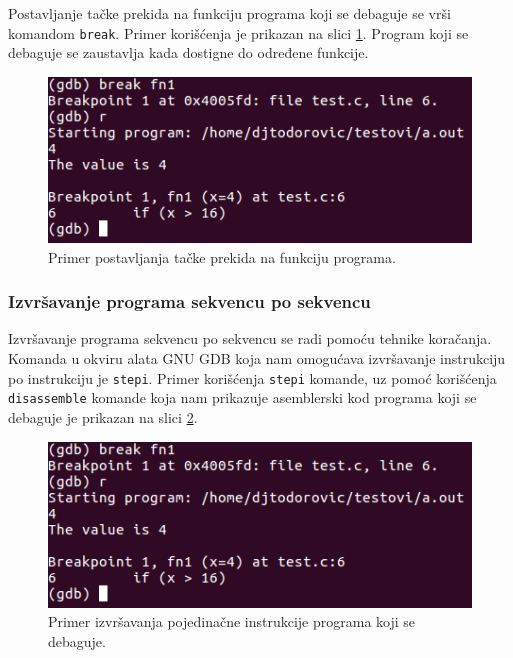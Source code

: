 \documentclass[12pt,oneside]{memoir}
\begin{document}
Postavljanje tačke prekida na funkciju programa koji se debaguje se vrši komandom \texttt{break}. Primer korišćenja je prikazan na slici \ref{fig:break-fn}. Program koji se debaguje se zaustavlja kada dostigne do određene funkcije.

\begin{figure}[h!]
	\begin{center}
		\includegraphics[scale=0.5]{slike/break-fn.png}
	\end{center}
	\caption{Primer postavljanja tačke prekida na funkciju programa.}
	\label{fig:break-fn}
\end{figure}

\subsubsection{Izvršavanje programa sekvencu po sekvencu}

Izvršavanje programa sekvencu po sekvencu se radi pomoću tehnike koračanja. Komanda u okviru alata GNU GDB koja nam omogućava izvršavanje instrukciju po instrukciju je \texttt{stepi}. Primer korišćenja \texttt{stepi} komande, uz pomoć korišćenja \texttt{disassemble} komande koja nam prikazuje asemblerski kod programa koji se debaguje je prikazan na slici \ref{fig:stepi}.

\begin{figure}[h!]
	\begin{center}
		\includegraphics[scale=0.5]{slike/break-fn.png}
	\end{center}
	\caption{Primer izvršavanja pojedinačne instrukcije programa koji se debaguje.}
	\label{fig:stepi}
\end{figure}
\end{document}
